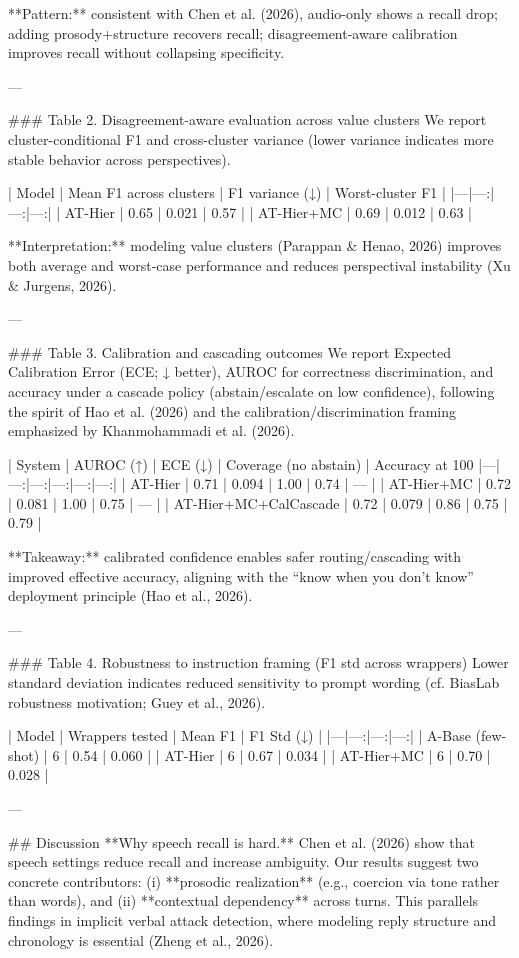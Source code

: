 **Pattern:** consistent with Chen et al. (2026), audio-only shows a recall drop; adding prosody+structure recovers recall; disagreement-aware calibration improves recall without collapsing specificity.

---

### Table 2. Disagreement-aware evaluation across value clusters  
We report cluster-conditional F1 and cross-cluster variance (lower variance indicates more stable behavior across perspectives).

| Model | Mean F1 across clusters | F1 variance (↓) | Worst-cluster F1 |
|---|---:|---:|---:|
| AT-Hier | 0.65 | 0.021 | 0.57 |
| AT-Hier+MC | 0.69 | 0.012 | 0.63 |

**Interpretation:** modeling value clusters (Parappan & Henao, 2026) improves both average and worst-case performance and reduces perspectival instability (Xu & Jurgens, 2026).

---

### Table 3. Calibration and cascading outcomes  
We report Expected Calibration Error (ECE; ↓ better), AUROC for correctness discrimination, and accuracy under a cascade policy (abstain/escalate on low confidence), following the spirit of Hao et al. (2026) and the calibration/discrimination framing emphasized by Khanmohammadi et al. (2026).

| System | AUROC (↑) | ECE (↓) | Coverage (no abstain) | Accuracy at 100%
|---|---:|---:|---:|---:|---:|
| AT-Hier | 0.71 | 0.094 | 1.00 | 0.74 | — |
| AT-Hier+MC | 0.72 | 0.081 | 1.00 | 0.75 | — |
| AT-Hier+MC+CalCascade | 0.72 | 0.079 | 0.86 | 0.75 | 0.79 |

**Takeaway:** calibrated confidence enables safer routing/cascading with improved effective accuracy, aligning with the “know when you don’t know” deployment principle (Hao et al., 2026).

---

### Table 4. Robustness to instruction framing (F1 std across wrappers)  
Lower standard deviation indicates reduced sensitivity to prompt wording (cf. BiasLab robustness motivation; Guey et al., 2026).

| Model | Wrappers tested | Mean F1 | F1 Std (↓) |
|---|---:|---:|---:|
| A-Base (few-shot) | 6 | 0.54 | 0.060 |
| AT-Hier | 6 | 0.67 | 0.034 |
| AT-Hier+MC | 6 | 0.70 | 0.028 |

---

## Discussion  
**Why speech recall is hard.** Chen et al. (2026) show that speech settings reduce recall and increase ambiguity. Our results suggest two concrete contributors: (i) **prosodic realization** (e.g., coercion via tone rather than words), and (ii) **contextual dependency** across turns. This parallels findings in implicit verbal attack detection, where modeling reply structure and chronology is essential (Zheng et al., 2026).

